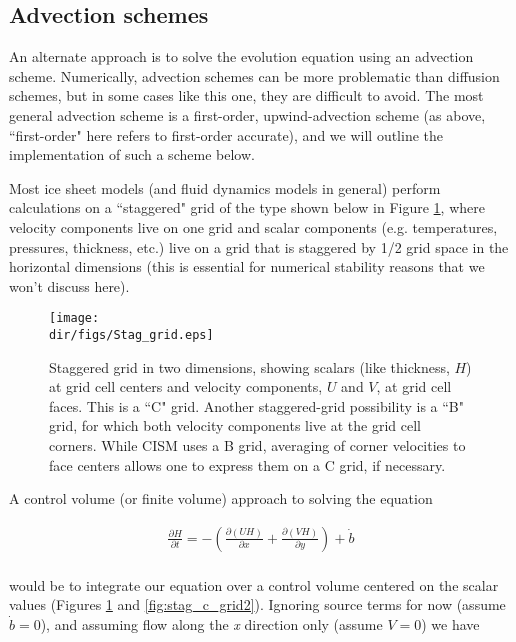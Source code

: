 \subsection{Advection schemes}
An alternate approach is to solve the evolution equation using an advection scheme. Numerically, advection schemes can be more problematic than diffusion schemes, but in some cases like this one, they are difficult to avoid. The most general advection scheme is a first-order, upwind-advection scheme (as above, ``first-order" here refers to first-order accurate), and we will outline the implementation of such a scheme below.

Most ice sheet models (and fluid dynamics models in general) perform calculations on a ``staggered" grid of the type shown below in Figure \ref{fig:stag_c_grid}, where velocity components live on one grid and scalar components (e.g. temperatures, pressures, thickness, etc.) live on a grid that is staggered by 1/2 grid space in the horizontal dimensions (this is essential for numerical stability reasons that we won't discuss here).

\begin{figure}
  \begin{center}
    \texttt{[image: \\dir/figs/Stag\_grid.eps]}
  \end{center}
\caption{Staggered grid in two dimensions, showing scalars (like thickness, $H$) at grid cell centers and velocity components, $U$ and $V$, at grid cell faces. This is a ``C" grid. Another staggered-grid possibility is a ``B" grid, for which both velocity components live at the grid cell corners. While CISM uses a B grid, averaging of corner velocities to face centers allows one to express them on a C grid, if necessary.}
  \label{fig:stag_c_grid}
\end{figure} 

A control volume (or finite volume) approach to solving the equation 

\begin{align*}
\frac{\partial H}{\partial t}=-\left( \frac{\partial \left( UH \right)}{\partial x}+\frac{\partial \left( VH \right)}{\partial y} \right)+\dot{b} \\ 
\end{align*}

would be to integrate our equation over a control volume centered on the scalar values (Figures \ref{fig:stag_c_grid} and \ref{fig:stag_c_grid2}). Ignoring source terms for now (assume $\dot{b}=0$), and assuming flow along the \textit{x} direction only (assume $V=0$) we have

